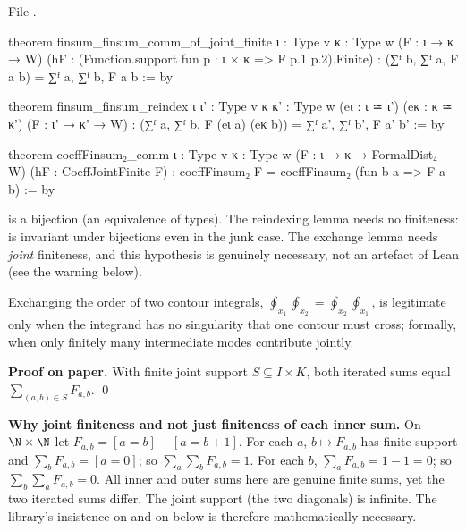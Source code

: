 \noindent File .
\begin{leancode}
theorem finsum_finsum_comm_of_joint_finite {ι : Type v} {κ : Type w}
    (F : ι → κ → W)
    (hF : (Function.support fun p : ι × κ => F p.1 p.2).Finite) :
    (∑ᶠ b, ∑ᶠ a, F a b) = ∑ᶠ a, ∑ᶠ b, F a b := by

theorem finsum_finsum_reindex {ι ι' : Type v} {κ κ' : Type w}
    (eι : ι ≃ ι') (eκ : κ ≃ κ') (F : ι' → κ' → W) :
    (∑ᶠ a, ∑ᶠ b, F (eι a) (eκ b)) = ∑ᶠ a', ∑ᶠ b', F a' b' := by

theorem coeffFinsum₂_comm {ι : Type v} {κ : Type w}
    (F : ι → κ → FormalDist₄ W) (hF : CoeffJointFinite F) :
    coeffFinsum₂ F = coeffFinsum₂ (fun b a => F a b) := by
\end{leancode}

\begin{dictionary}
 is a bijection (an equivalence of types). The reindexing lemma needs no finiteness:  is
invariant under bijections even in the junk case. The exchange lemma needs \emph{joint} finiteness, and this
hypothesis is genuinely necessary, not an artefact of Lean (see the warning below).
\end{dictionary}

\begin{physics}
Exchanging the order of two contour integrals, $\oint_{x_1}\oint_{x_2} = \oint_{x_2}\oint_{x_1}$, is legitimate only when the
integrand has no singularity that one contour must cross; formally, when only finitely many intermediate modes
contribute jointly.
\end{physics}

\textbf{Proof on paper.} With finite joint support $S\subseteq I\times K$, both iterated sums equal $\sum_{(a,b)\in S}F_{a,b}$. \qed

\begin{warning}\label{l01:warn:fubini}
\textbf{Why joint finiteness and not just finiteness of each inner sum.} On $\N\times\N$ let $F_{a,b} = [a = b]-[a = b+1]$.
For each $a$, $b\mapsto F_{a,b}$ has finite support and $\sum_bF_{a,b} = [a = 0]$; so $\sum_a\sum_bF_{a,b} = 1$. For each
$b$, $\sum_aF_{a,b} = 1-1 = 0$; so $\sum_b\sum_aF_{a,b} = 0$. All inner and outer sums here are genuine finite sums, yet the
two iterated sums differ. The joint support (the two diagonals) is infinite. The library's insistence on
 and on  below is therefore mathematically necessary.
\end{warning}

